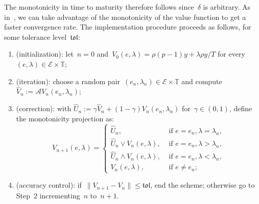 \documentclass{amsart}[11pt]
\numberwithin{equation}{section}
\theoremstyle{definition}
\newcommand{\Ee}{\mathcal{E}}
\newcommand{\TT}{\mathbb{T}}
\begin{document}
The monotonicity in time to maturity therefore follows since~$\delta$ is arbitrary.
As in~\cite{jiang2015approximate, nascimento2009optimal},
we can take advantage of the monotonicity of the value function to get a faster convergence rate. 
The implementation procedure proceeds as follows, for some tolerance level~$\mathfrak{tol}$:
\begin{enumerate}[Step 1.]
\item (initialization): let~$n = 0$ and~$V_0(e, \lambda) = \rho(p-1)y + \lambda\rho y/T$ for every~$(e, \lambda)\in \Ee\times\TT$;
\item (iteration): choose a random pair~$(e_n, \lambda_n)\in \Ee\times \TT$ and compute~$\widehat{V}_n:=\mathcal{A}V_n(e_n, \lambda_n)$;
\item (correction): with
$\widehat{U}_n := \gamma \widehat{V}_n + (1 - \gamma)V_n(e_n, \lambda_n)$ for~$\gamma\in(0, 1)$,
define the monotonicity projection as:
\begin{equation*}
V_{n+1}(e, \lambda)
= 
 \left\{
 \begin{array}{ll}
\widehat{U}_n, & \text{ if }e = e_n, \lambda = \lambda_n,\\
\widehat{U}_n\vee V_n(e, \lambda), & \text{ if }e = e_n, \lambda > \lambda_n,\\
\widehat{U}_n\land V_n(e, \lambda), & \text{ if }e = e_n, \lambda < \lambda_n,\\
V_n(e, \lambda), & \text{ if }e \not= e_n;
 \end{array}
\right.
\end{equation*}
\item (accuracy control): if~$\lVert V_{n+1} - V_n\lVert \leq \mathfrak{tol}$, end the scheme; 
otherwise go to Step~$2$ incrementing~$n$ to~$n+1$.
\end{enumerate}
\end{document}
